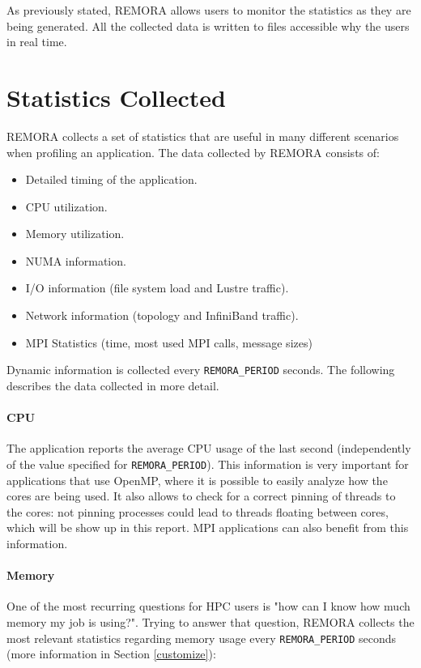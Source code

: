 \documentclass[10pt,a4paper]{report}
\begin{document}
As previously stated, REMORA allows users to monitor the statistics as they are being generated. All the collected data is written to files accessible why the users in real time.

\section{Statistics Collected}
REMORA collects a set of statistics that are useful in many different scenarios when profiling an application. The data collected by REMORA consists of:

\begin{itemize}
\item Detailed timing of the application.
\item CPU utilization.
\item Memory utilization.
\item NUMA information.
\item I/O information (file system load and Lustre traffic).
\item Network information (topology and InfiniBand traffic).
\item MPI Statistics (time, most used MPI calls, message sizes)
\end{itemize}

Dynamic information is collected every \texttt{REMORA\_PERIOD} seconds. The following describes the data collected in more detail. 

\paragraph{CPU}
The application reports the average CPU usage of the last second (independently of the value specified for \texttt{REMORA\_PERIOD}). This information is very important for applications that use OpenMP, where it is possible to easily analyze how the cores are being used. It also allows to check for a correct pinning of threads to the cores: not pinning processes could lead to threads floating between cores, which will be show up in this report. MPI applications can also benefit from this information.

\paragraph{Memory}
One of the most recurring questions for HPC users is "how can I know how much memory my job is using?". Trying to answer that question, REMORA collects the most relevant statistics regarding memory usage every \texttt{REMORA\_PERIOD} seconds (more information in Section \ref{customize}):
\end{document}
